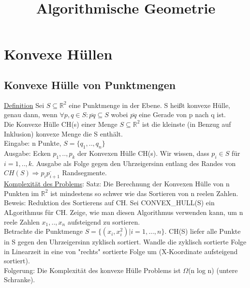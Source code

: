 \documentclass[a4paper]{article}
\begin{document}
\title{Algorithmische Geometrie}
\maketitle
\section{Konvexe Hüllen}
\subsection{Konvexe Hülle von Punktmengen}
\underline{Definition} Sei $S\subseteq \mathbb{R}^2$ eine Punktmenge in der Ebene. S heißt konvexe Hülle, genau dann, wenn $\forall p,q\in S: \overline{pq} \subseteq S$ wobei $\overline{pq}$ eine Gerade von p nach q ist.\\
Die Konvexe Hülle CH(s) einer Menge $S\subseteq \mathbb{R}^2$ ist die kleinste (in Benzug auf Inklusion) konvexe Menge die S enthält.\\

Eingabe: n Punkte, $S=\{q_1,..,q_n\}$\\
Ausgabe: Ecken $p_1,..,p_k$ der Konvexen Hülle CH(s). Wir wissen, dass $p_i \in S$ für $i=1,..,k$. Ausgabe als Folge gegen den Uhrzeigersinn entlang des Randes von $CH(S)\Rightarrow \overline{p_ip_{i+1}}$ Randsegmente.\\
\underline{Komplexität des Problems}: Satz: Die Berechnung der Konvexen Hülle von n Punkten im $\mathbb{R}^2$ ist mindestens so schwer wie das Sortieren von n reelen Zahlen.\\
Beweis: Reduktion des Sortierens auf CH. Sei CONVEX\_HULL(S) ein ALgorithmus für CH. Zeige, wie man diesen Algorithmus verwenden kann, um n reele Zahlen $x_1,..,x_n$ aufsteigend zu sortieren.\\
Betrachte die Punktmenge $S=\{(x_i,x_i^2)|i=1,...,n\}$. CH(S) liefer alle Punkte in S gegen den Uhrzeigersinn zyklisch sortiert. Wandle die zyklisch sortierte Folge in Linearzeit in eine von "rechts" sortierte Folge um (X-Koordinate aufsteigend sortiert).\\
Folgerung: Die Komplexität des konvexe Hülle Problems ist $\Omega$(n log n) (untere Schranke).
\end{document}
